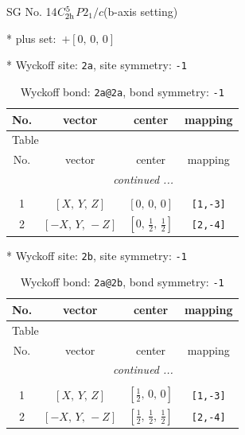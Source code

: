 \documentclass[fleqn,8pt]{jsarticle}
\begin{document}
\setcounter{MaxMatrixCols}{32}

\renewcommand{\tablename}{Table~}
\renewcommand{\figurename}{Figure~}
\begin{center}
\LARGE
SG No. 14\quad$C_{\rm 2h}^{5}$\quad$P2_1/c$\quad(b-axis setting)\quad[ monoclinic ]
\end{center}

* plus set:\,\,\,$+\left[ 0,\, 0,\, 0 \right]$


* Wyckoff site: {\tt 2a}, site symmetry: {\tt -1}
\renewcommand{\arraystretch}{1.2}
\begin{longtable}{cccc}
\caption{Wyckoff bond: {\tt 2a@2a}, bond symmetry: {\tt -1}}
 \\
 \hline \hline
No. & vector & center & mapping \\ \hline \endfirsthead

\multicolumn{3}{l}{\tablename\ \thetable{}} \\
 \hline \hline
No. & vector & center & mapping \\ \hline \endhead

 \hline \hline
\multicolumn{3}{r}{\footnotesize\it continued ...} \\ \endfoot

 \hline \hline
\multicolumn{3}{r}{} \\ \endlastfoot

1 & $\left[ X,\, Y,\, Z \right]$ & $\left[ 0,\, 0,\, 0 \right]$ & {\tt [1,-3]} \\ \hline
2 & $\left[ - X,\, Y,\, - Z \right]$ & $\left[ 0,\, \frac{1}{2},\, \frac{1}{2} \right]$ & {\tt [2,-4]} \\
\end{longtable}
* Wyckoff site: {\tt 2b}, site symmetry: {\tt -1}
\renewcommand{\arraystretch}{1.2}
\begin{longtable}{cccc}
\caption{Wyckoff bond: {\tt 2a@2b}, bond symmetry: {\tt -1}}
 \\
 \hline \hline
No. & vector & center & mapping \\ \hline \endfirsthead

\multicolumn{3}{l}{\tablename\ \thetable{}} \\
 \hline \hline
No. & vector & center & mapping \\ \hline \endhead

 \hline \hline
\multicolumn{3}{r}{\footnotesize\it continued ...} \\ \endfoot

 \hline \hline
\multicolumn{3}{r}{} \\ \endlastfoot

1 & $\left[ X,\, Y,\, Z \right]$ & $\left[ \frac{1}{2},\, 0,\, 0 \right]$ & {\tt [1,-3]} \\ \hline
2 & $\left[ - X,\, Y,\, - Z \right]$ & $\left[ \frac{1}{2},\, \frac{1}{2},\, \frac{1}{2} \right]$ & {\tt [2,-4]} \\
\end{longtable}
\end{document}
